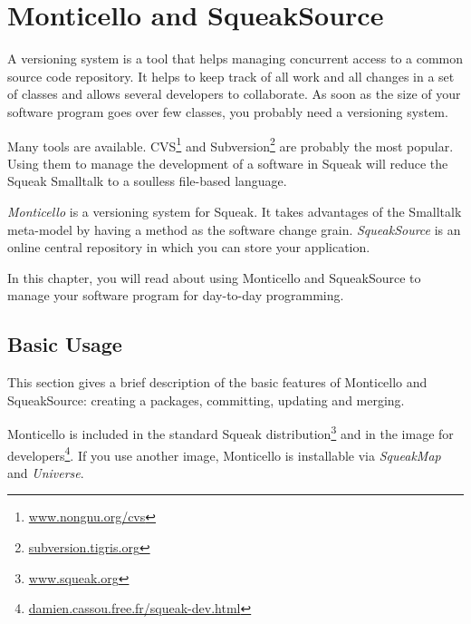 \documentclass[a4paper,10pt,twoside]{book}
\begin{document}
	\sloppy
\fi

\newcommand{\figlabel}[1]{\label{fig:#1}}
\newcommand{\seclabel}[1]{\label{sec:#1}}

\chapter{Monticello and SqueakSource}


A versioning system is a tool that helps managing concurrent access to a common source code repository. It helps to keep track of all work and all changes in a set of classes and allows several developers to collaborate. As soon as the size of your software program goes over few classes, you probably need a versioning system.

Many tools are available. CVS\footnote{\href{http://www.nongnu.org/cvs/}{www.nongnu.org/cvs}} and Subversion\footnote{\href{http://subversion.tigris.org/}{subversion.tigris.org}} are probably the most popular. Using them to manage the development of a software in Squeak will reduce the Squeak Smalltalk to a soulless file-based language. 

\emph{Monticello} is a versioning system for Squeak. It takes advantages of the Smalltalk meta-model by having a method as the software change grain. \emph{SqueakSource} is an online central repository in which you can store your application.

In this chapter, you will read about using Monticello and SqueakSource to manage your software program for day-to-day programming.


\section{Basic Usage}

This section gives a brief description of the basic features of Monticello and SqueakSource: creating a packages, committing, updating and merging.

Monticello is included in the standard Squeak distribution\footnote{\href{http://www.squeak.org}{www.squeak.org}} and in the image for developers\footnote{\href{http://damien.cassou.free.fr/squeak-dev.html}{damien.cassou.free.fr/squeak-dev.html}}. If you use another image, Monticello is installable via \emph{SqueakMap} and \emph{Universe}.
\end{document}
